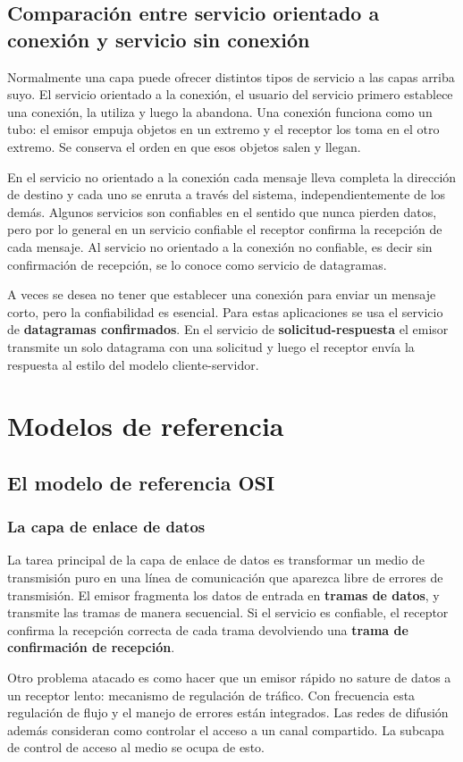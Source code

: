 \documentclass[10pt,a4paper]{report}
\begin{document}
\subsection{Comparación entre servicio orientado a conexión y servicio sin conexión}
\par Normalmente una capa puede ofrecer distintos tipos de servicio a las capas arriba 
suyo. El servicio orientado a la conexión, el usuario del servicio primero establece una 
conexión, la utiliza y luego la abandona. Una conexión funciona como un tubo: el 
emisor empuja objetos en un extremo y el receptor los toma en el otro extremo. Se 
conserva el orden en que esos objetos salen y llegan.
\par En el servicio no orientado a la conexión cada mensaje lleva completa la dirección 
de destino y cada uno se enruta a través del sistema, independientemente de los 
demás. Algunos servicios son confiables en el sentido que nunca pierden datos, pero 
por lo general en un servicio confiable el receptor confirma la recepción de cada 
mensaje. Al servicio no orientado a la conexión no confiable, es decir sin confirmación 
de recepción, se lo conoce como servicio de datagramas. 
\par A veces se desea no tener que establecer una conexión para enviar un mensaje 
corto, pero la confiabilidad es esencial. Para estas aplicaciones se usa el servicio de 
\textbf{datagramas confirmados}. En el servicio de \textbf{solicitud-respuesta} el 
emisor transmite un solo datagrama con una solicitud y luego el receptor envía la 
respuesta al estilo del modelo cliente-servidor.


\section{Modelos de referencia}

\subsection{El modelo de referencia OSI}

\subsubsection{La capa de enlace de datos}
\par La tarea principal de la capa de enlace de datos es transformar un medio de 
transmisión puro en una línea de comunicación que aparezca libre de errores de 
transmisión. El emisor fragmenta los datos de entrada en \textbf{tramas de datos}, y 
transmite las tramas de manera secuencial. Si el servicio es confiable, el receptor 
confirma la recepción correcta de cada trama devolviendo una \textbf{trama de 
confirmación de recepción}.
\par Otro problema atacado es como hacer que un emisor rápido no sature de datos a 
un receptor lento: mecanismo de regulación de tráfico. Con frecuencia esta regulación 
de flujo y el manejo de errores están integrados. Las redes de difusión además 
consideran como controlar el acceso a un canal compartido. La subcapa de control de 
acceso al medio se ocupa de esto.
\end{document}
